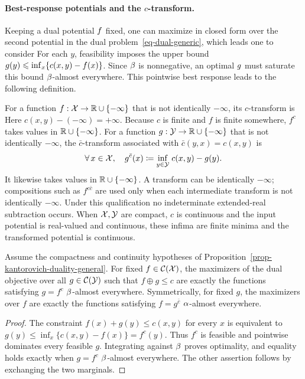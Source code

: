 \paragraph{Best-response potentials and the $c$-transform.}

Keeping a dual potential $f$ fixed, one can maximize in closed form over the second potential in the dual problem~\eqref{eq-dual-generic}, which leads one to consider
For each \(y\), feasibility imposes the upper bound
\(g(y)\leqslant\inf_x\{c(x,y)-f(x)\}\). Since \(\beta\) is nonnegative, an optimal \(g\) must saturate this bound \(\beta\)-almost everywhere. This pointwise best response leads to the following definition.

\begin{defn}[$c$-transform]\label{def-c-transform}
	For a function $f:\mathcal{X}\to\mathbb{R}\cup\{-\infty\}$ that is not identically $-\infty$, its $c$-transform is
	Here $c(x,y)-(-\infty)=+\infty$. Because $c$ is finite and $f$ is finite somewhere, $f^c$ takes values in $\mathbb{R}\cup\{-\infty\}$. For a function $g:\mathcal{Y}\to\mathbb{R}\cup\{-\infty\}$ that is not identically $-\infty$, the $\bar c$-transform associated with $\bar c(y,x)=c(x,y)$ is
	\[
		\forall \, x \in \mathcal{X}, \quad
		g^{\bar{c}}(x) \coloneqq \underset{y \in \mathcal{Y}}{\inf}\; c(x,y) - g(y).
	\]
	It likewise takes values in $\mathbb{R}\cup\{-\infty\}$. A transform can be identically $-\infty$; compositions such as $f^{c\bar c}$ are used only when each intermediate transform is not identically $-\infty$. Under this qualification no indeterminate extended-real subtraction occurs. When $\mathcal{X},\mathcal{Y}$ are compact, $c$ is continuous and the input potential is real-valued and continuous, these infima are finite minima and the transformed potential is continuous.
\end{defn}

\begin{prop}\label{prop-c-transform-semi-relaxed}
	Assume the compactness and continuity hypotheses of Proposition~\ref{prop-kantorovich-duality-general}. For fixed $f\in\mathcal{C}(\mathcal{X})$, the maximizers of the dual objective over all $g\in\mathcal{C}(\mathcal{Y})$ such that $f\oplus g\leq c$ are exactly the functions satisfying $g=f^c$ $\beta$-almost everywhere. Symmetrically, for fixed $g$, the maximizers over $f$ are exactly the functions satisfying $f=g^{\bar c}$ $\alpha$-almost everywhere.
\end{prop}
\begin{proof}
	The constraint $f(x)+g(y)\leq c(x,y)$ for every $x$ is equivalent to
	\(g(y)\leq\inf_x\{c(x,y)-f(x)\}=f^c(y)\).
	Thus $f^c$ is feasible and pointwise dominates every feasible $g$. Integrating against $\beta$ proves optimality, and equality holds exactly when $g=f^c$ $\beta$-almost everywhere. The other assertion follows by exchanging the two marginals.
\end{proof}

